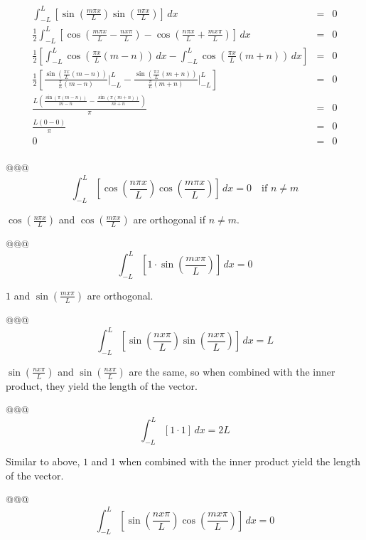 \documentclass[10pt]{article}
\begin{document}
\begin{easylist}[enumerate]
    \begin{align*}
        \int_{-L}^L \left[ \sin\left(\frac{m \pi x}{L} \right) \sin\left(\frac{n \pi x}{L} \right) \right] \, dx &=& 0\\
        \frac{1}{2} \int_{-L}^L \left[ \cos\left(\frac{m \pi x}{L} - \frac{nx\pi}{L}\right) - \cos\left(\frac{n \pi x}{L} + \frac{mx\pi}{L}\right) \right] \, dx &=& 0\\
        \frac{1}{2} \left[ \int_{-L}^L \cos\left(\frac{\pi x}{L}(m - n) \right) \, dx -
            \int_{-L}^L \cos\left(\frac{\pi x}{L} (m + n) \right) \, dx \right] &=& 0\\
        \frac{1}{2} \left[ \frac{\sin\left( \frac{\pi x}{L} (m - n) \right)}{\frac{\pi}{L}(m - n)} \bigg|_{-L}^L -
            \frac{\sin\left( \frac{\pi x}{L} (m + n) \right)}{\frac{\pi}{L}(m + n)} \bigg|_{-L}^L \right] &=& 0\\
        \frac{L \left(\frac{\sin (\pi (m-n))}{m-n}-\frac{\sin (\pi (m+n))}{m+n}\right)}{\pi } &=& 0\\
        \frac{L(0 - 0)}{\pi} &=& 0\\
        0 &=& 0\\
    \end{align*}

    @@@ \[ \int_{-L}^L \left[ \cos\left(\frac{n \pi x}{L}\right) \cos\left(\frac{m \pi x}{L}\right) \right] \, dx = 0 \quad \text{if } n \neq m \]

    $\cos\left(\frac{n \pi x}{L}\right)$ and $\cos\left(\frac{m \pi x}{L}\right)$ are orthogonal if $n \neq m$.

    @@@ \[ \int_{-L}^L \left[ 1 \cdot \sin\left(\frac{mx\pi}{L}\right) \right] \, dx = 0 \]

    $1$ and $\sin\left(\frac{mx\pi}{L}\right)$ are orthogonal.

    @@@ \[ \int_{-L}^L \left[ \sin\left(\frac{nx\pi}{L}\right) \sin\left(\frac{nx\pi}{L}\right) \right] \, dx = L \]

    $\sin\left(\frac{nx\pi}{L}\right)$ and $\sin\left(\frac{nx\pi}{L}\right)$ are the same, so when combined with the
    inner product, they yield the length of the vector.

    @@@ \[ \int_{-L}^L \left[ 1 \cdot 1 \right] \, dx = 2 L \]

    Similar to above, $1$ and $1$ when combined with the inner product yield the length of the vector.

    @@@ \[ \int_{-L}^L \left[ \sin\left(\frac{nx\pi}{L}\right) \cos\left(\frac{mx\pi}{L}\right) \right] \, dx = 0 \]


\end{easylist}
\end{document}
